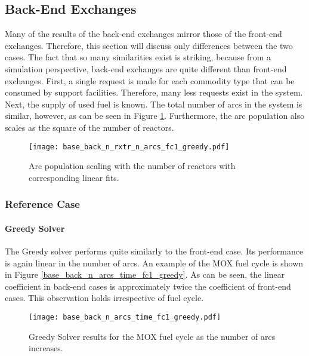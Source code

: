 \subsection{Back-End Exchanges}

Many of the results of the back-end exchanges mirror those of the front-end
exchanges. Therefore, this section will discuss only differences between the two
cases. The fact that so many similarities exist is striking, because from a
simulation perspective, back-end exchanges are quite different than front-end
exchanges. First, a single request is made for each commodity type that can be
consumed by support facilities. Therefore, many less requests exist in the
system. Next, the supply of used fuel is known. The total number of arcs in the
system is similar, however, as can be seen in Figure
\ref{fig:base_back_n_rxtr_n_arcs_fc1_greedy}. Furthermore, the arc
population also scales as the square of the number of reactors. 

\begin{figure}[h!]
  \begin{center}
    \texttt{[image: base\_back\_n\_rxtr\_n\_arcs\_fc1\_greedy.pdf]}
    \caption[]{
      \label{fig:base_back_n_rxtr_n_arcs_fc1_greedy}
      Arc population scaling with the number of reactors with corresponding linear fits.}
  \end{center}
\end{figure}

\subsubsection{Reference Case}

\paragraph{Greedy Solver}

The Greedy solver performs quite similarly to the front-end case. Its
performance is again linear in the number of arcs. An example of the MOX fuel
cycle is shown in Figure \ref{base_back_n_arcs_time_fc1_greedy}. As can be seen,
the linear coefficient in back-end cases is approximately twice the coefficient
of front-end cases. This observation holds irrespective of fuel cycle.

\begin{figure}[h!]
  \begin{center}
    \texttt{[image: base\_back\_n\_arcs\_time\_fc1\_greedy.pdf]}
    \caption[]{
      \label{fig:base_back_n_arcs_time_fc1_greedy}
      Greedy Solver results for the MOX fuel cycle as the number of arcs
      increases.      
    }
  \end{center}
\end{figure}

